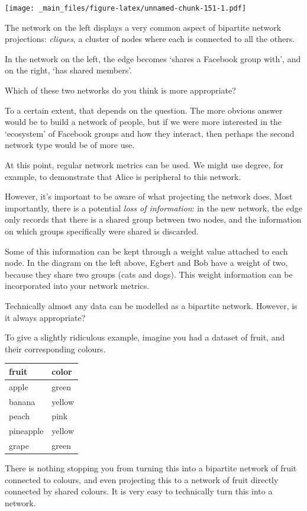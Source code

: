 \documentclass[
]{book}
\begin{document}
\texttt{[image: \_main\_files/figure-latex/unnamed-chunk-151-1.pdf]}

The network on the left displays a very common aspect of bipartite network projections: \emph{cliques}, a cluster of nodes where each is connected to all the others.

In the network on the left, the edge becomes `shares a Facebook group with', and on the right, `has shared members'.

Which of these two networks do you think is more appropriate?

To a certain extent, that depends on the question. The more obvious answer would be to build a network of people, but if we were more interested in the `ecosystem' of Facebook groups and how they interact, then perhaps the second network type would be of more use.

At this point, regular network metrics can be used. We might use degree, for example, to demonstrate that Alice is peripheral to this network.

However, it's important to be aware of what projecting the network does. Most importantly, there is a potential \emph{loss of information}: in the new network, the edge only records that there is a shared group between two nodes, and the information on which groups specifically were shared is discarded.

Some of this information can be kept through a weight value attached to each node. In the diagram on the left above, Egbert and Bob have a weight of two, because they share two groups (cats and dogs). This weight information can be incorporated into your network metrics.

Technically almost any data can be modelled as a bipartite network. However, is it always appropriate?

To give a slightly ridiculous example, imagine you had a dataset of fruit, and their corresponding colours.

\begin{tabular}[t]{ll}
\toprule
fruit & color\\
\midrule
apple & green\\
banana & yellow\\
peach & pink\\
pineapple & yellow\\
grape & green\\
\bottomrule
\end{tabular}

There is nothing stopping you from turning this into a bipartite network of fruit connected to colours, and even projecting this to a network of fruit directly connected by shared colours. It is very easy to technically turn this into a network.
\end{document}
